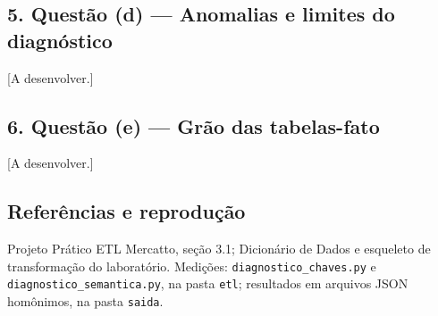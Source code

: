 \documentclass[
]{article}
\begin{document}
\subsection{5. Questão (d) --- Anomalias e limites do
diagnóstico}\label{questuxe3o-d-anomalias-e-limites-do-diagnuxf3stico}

{[}A desenvolver.{]}

\subsection{6. Questão (e) --- Grão das
tabelas-fato}\label{questuxe3o-e-gruxe3o-das-tabelas-fato}

{[}A desenvolver.{]}

\subsection{Referências e
reprodução}\label{referuxeancias-e-reproduuxe7uxe3o}

Projeto Prático ETL Mercatto, seção 3.1; Dicionário de Dados e esqueleto
de transformação do laboratório. Medições:
\texttt{diagnostico\_chaves.py} e \texttt{diagnostico\_semantica.py}, na
pasta \texttt{etl}; resultados em arquivos JSON homônimos, na pasta
\texttt{saida}.
\end{document}

